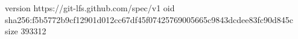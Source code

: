 version https://git-lfs.github.com/spec/v1
oid sha256:f5b5772b9cf12901d012cc67df45f07425769005665c9843dcdee83fc90d845c
size 393312
